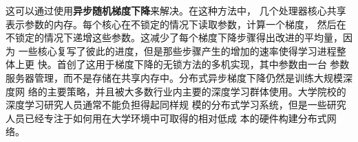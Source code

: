 这可以通过使用\textbf{异步随机梯度下降}\citep{NIPS2011_4390}来解决。在这种方法中，
几个处理器核心共享表示参数的内存。每个核心在不锁定的情况下读取参数，计算一个梯度，
然后在不锁定的情况下递增这些参数。这减少了每个梯度下降步骤得出改进的平均量，因为
一些核心复写了彼此的进度，但是那些步骤产生的增加的速率使得学习进程整体上更
快。\citet{NIPS2012_4687}首创了这用于梯度下降的无锁方法的多机实现，其中参数由一台
参数服务器管理，而不是存储在共享内存中。分布式异步梯度下降仍然是训练大规模深度网
络的主要策略，并且被大多数行业内主要的深度学习群体使用\citep{186212,
  DBLP:journals/corr/WuYSDS15}。大学院校的深度学习研究人员通常不能负担得起同样规
模的分布式学习系统，但是一些研究人员已经专注于如何用在大学环境中可取得的相对低成
本的硬件构建分布式网络\citep{coates2013deep}。
